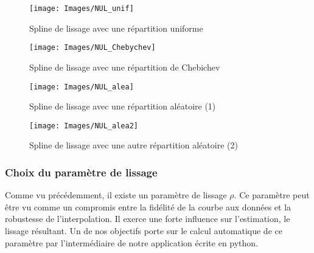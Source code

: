 \documentclass[a4paper,12pt]{article} %
\begin{document}
                \begin{figure}[H]
                \begin{center}
                \texttt{[image: Images/NUL\_unif]} 
                \end{center}
                \caption{Spline de lissage avec une répartition uniforme}
                \label{unif}
                \end{figure}
                
                \begin{figure}[H]
                \begin{center}
                \texttt{[image: Images/NUL\_Chebychev]} 
                \end{center}
                \caption{Spline de lissage avec une répartition de Chebichev}
                \label{chebi}
                \end{figure}
                
                \begin{figure}[H]
                \begin{center}
                \texttt{[image: Images/NUL\_alea]} 
                \end{center}
                \caption{Spline de lissage avec une répartition aléatoire (1)}
                \label{alea1}
                \end{figure}
                
                
                \begin{figure}[H]
                \begin{center}
                \texttt{[image: Images/NUL\_alea2]} 
                \end{center}
                \caption{Spline de lissage avec une autre répartition aléatoire (2)}
                \label{alea2}
                \end{figure}
            
			\subsubsection{Choix du paramètre de lissage}
                Comme vu précédemment, il existe un paramètre de lissage $\rho$. Ce paramètre peut être vu comme un compromis entre la fidélité de la courbe aux données et la robustesse de l'interpolation. Il exerce une forte influence sur l'estimation, le lissage résultant. Un de nos objectifs porte sur le calcul automatique de ce paramètre par l'intermédiaire de notre application écrite en python.\\
                
\end{document}
